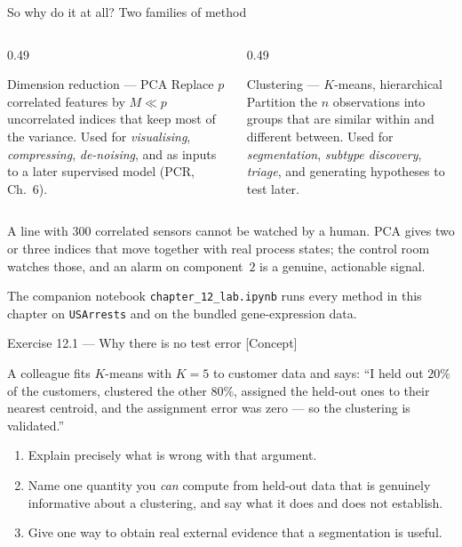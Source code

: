 \documentclass[aspectratio=169,11pt]{beamer}
\begin{document}
\begin{frame}{So why do it at all? Two families of method}
  \footnotesize
  \begin{columns}[t]
    \begin{column}{0.49\textwidth}
      \begin{block}{Dimension reduction --- PCA}
        \footnotesize
        Replace $p$ correlated features by $M \ll p$ uncorrelated indices that keep most of
        the variance. Used for \emph{visualising}, \emph{compressing}, \emph{de-noising},
        and as inputs to a later supervised model (PCR, Ch.~6).
      \end{block}
    \end{column}
    \begin{column}{0.49\textwidth}
      \begin{block}{Clustering --- $K$-means, hierarchical}
        \footnotesize
        Partition the $n$ observations into groups that are similar within and different
        between. Used for \emph{segmentation}, \emph{subtype discovery}, \emph{triage},
        and generating hypotheses to test later.
      \end{block}
    \end{column}
  \end{columns}
  \begin{industry}
    A line with $300$ correlated sensors cannot be watched by a human. PCA gives two or
    three indices that move together with real process states; the control room watches
    those, and an alarm on component~$2$ is a genuine, actionable signal.
  \end{industry}
  \begin{labnote}
    The companion notebook \texttt{chapter\_12\_lab.ipynb} runs every method in this
    chapter on \texttt{USArrests} and on the bundled gene-expression data.
  \end{labnote}
\end{frame}

\begin{frame}{Exercise 12.1 --- Why there is no test error [Concept]}
\begin{exercise}
  A colleague fits $K$-means with $K=5$ to customer data and says: ``I held out $20\%$ of
  the customers, clustered the other $80\%$, assigned the held-out ones to their nearest
  centroid, and the assignment error was zero --- so the clustering is validated.''
  \begin{enumerate}
    \item Explain precisely what is wrong with that argument.
    \item Name one quantity you \emph{can} compute from held-out data that is genuinely
          informative about a clustering, and say what it does and does not establish.
    \item Give one way to obtain real external evidence that a segmentation is useful.
  \end{enumerate}
\end{exercise}
\end{frame}
\end{document}
